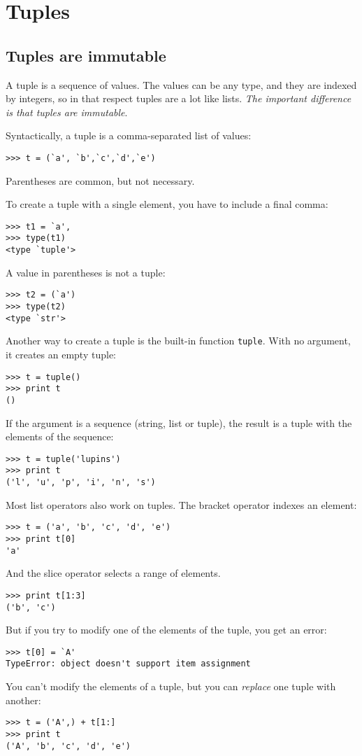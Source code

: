 \documentclass{article}
\begin{document}
\section{Tuples}
\subsection{Tuples are immutable}
A tuple is a sequence of values. The values can be any type, and they are
indexed by integers, so in that respect tuples are a lot like lists.
\emph{The important difference is that tuples are immutable}.

Syntactically, a tuple is a comma-separated list of values:
\begin{verbatim}
>>> t = (`a', `b',`c',`d',`e')
\end{verbatim}
Parentheses are common, but not necessary.

To create a tuple with a single element, you have to include a final comma:
\begin{verbatim}
>>> t1 = `a',
>>> type(t1)
<type `tuple'>
\end{verbatim}
A value in parentheses is not a tuple:
\begin{verbatim}
>>> t2 = (`a')
>>> type(t2)
<type `str'>
\end{verbatim}
Another way to create a tuple is the built-in function \verb|tuple|.
With no argument, it creates an empty tuple:
\begin{verbatim}
>>> t = tuple()
>>> print t
()
\end{verbatim}
If the argument is a sequence (string, list or tuple), the result is a
tuple with the elements of the sequence:
\begin{verbatim}
>>> t = tuple('lupins')
>>> print t
('l', 'u', 'p', 'i', 'n', 's')
\end{verbatim}

Most list operators also work on tuples. The bracket operator indexes an
element:
\begin{verbatim}
>>> t = ('a', 'b', 'c', 'd', 'e')
>>> print t[0]
'a'
\end{verbatim}
And the slice operator selects a range of elements.
\begin{verbatim}
>>> print t[1:3]
('b', 'c')
\end{verbatim}
But if you try to modify one of the elements of the tuple, you get an error:
\begin{verbatim}
>>> t[0] = `A'
TypeError: object doesn't support item assignment
\end{verbatim}
You can’t modify the elements of a tuple, but you can \emph{replace}
one tuple with another:
\begin{verbatim}
>>> t = ('A',) + t[1:]
>>> print t
('A', 'b', 'c', 'd', 'e')
\end{verbatim}
\end{document}
